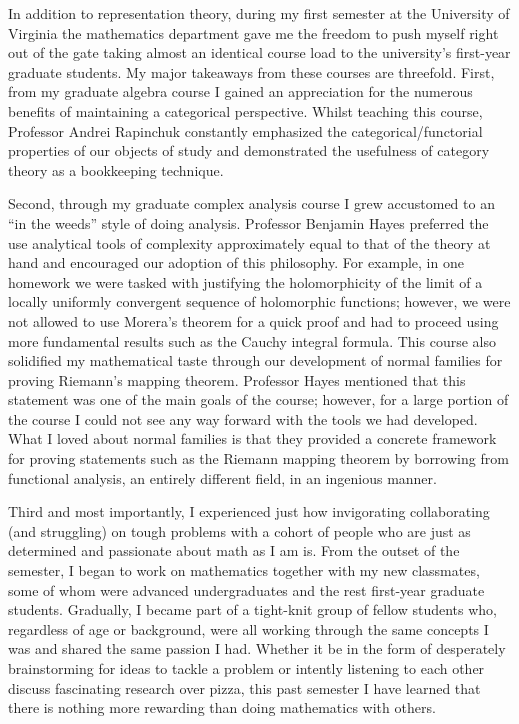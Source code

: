 \documentclass[11pt]{article}
\begin{document}
In addition to representation theory, during my first semester at the University of Virginia the mathematics department gave me the freedom to push myself right out of the gate taking almost an identical course load to the university's first-year graduate students. My major takeaways from these courses are threefold. First, from my graduate algebra course I gained an appreciation for the numerous benefits of maintaining a categorical perspective. Whilst teaching this course, Professor Andrei Rapinchuk constantly emphasized the categorical/functorial properties of our objects of study and demonstrated the usefulness of category theory as a bookkeeping technique.

Second, through my graduate complex analysis course I grew accustomed to an ``in the weeds'' style of doing analysis. Professor Benjamin Hayes preferred the use analytical tools of complexity approximately equal to that of the theory at hand and encouraged our adoption of this philosophy. For example, in one homework we were tasked with justifying the holomorphicity of the limit of a locally uniformly convergent sequence of holomorphic functions; however, we were not allowed to use Morera's theorem for a quick proof and had to proceed using more fundamental results such as the Cauchy integral formula. This course also solidified my mathematical taste through our development of normal families for proving Riemann's mapping theorem. Professor Hayes mentioned that this statement was one of the main goals of the course; however, for a large portion of the course I could not see any way forward with the tools we had developed. What I loved about normal families is that they provided a concrete framework for proving statements such as the Riemann mapping theorem by borrowing from functional analysis, an entirely different field, in an ingenious manner.


Third and most importantly, I experienced just how invigorating collaborating (and struggling) on tough problems with a cohort of people who are just as determined and passionate about math as I am is. From the outset of the semester, I began to work on mathematics together with my new classmates, some of whom were advanced undergraduates and the rest first-year graduate students. Gradually, I became part of a tight-knit group of fellow students who, regardless of age or background, were all working through the same concepts I was and shared the same passion I had. Whether it be in the form of desperately brainstorming for ideas to tackle a problem or intently listening to each other discuss fascinating research over pizza, this past semester I have learned that there is nothing more rewarding than doing mathematics with others.
\end{document}
